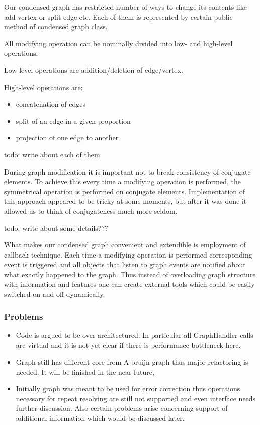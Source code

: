 \documentclass[12pt]{article}
\begin{document}
Our condensed graph has restricted number of ways to change its contents like add vertex or split edge etc. Each of them is represented by certain public method of condensed graph class.

All modifying operation can be nominally divided into low- and high-level operations.

Low-level operations are addition/deletion of edge/vertex.

High-level operations are:
\begin{itemize}
\item concatenation of edges
\item split of an edge in a given proportion
\item projection of one edge to another
\end{itemize}

todo: write about each of them

During graph modification it is important not to break consistency of conjugate elements. To achieve this every time a modifying operation is performed, the symmetrical operation is performed on conjugate elements. Implementation of this approach appeared to be tricky at some moments, but after it was done it allowed us to think of conjugateness much more seldom. 

todo: write about some details???

What makes our condensed graph convenient and extendible is employment of callback technique. Each time a modifying operation is performed corresponding event is triggered and all objects that listen to graph events are notified about what exactly happened to the graph.%
 Thus instead of overloading graph structure with information and features one can create external tools which could be easily switched on and off dynamically.

\subsubsection{Problems}
\begin{itemize}
\item Code is argued to be over-architectured. In particular all GraphHandler calls are virtual and it is not yet clear if there is performance bottleneck here.
\item Graph still has different core from A-bruijn graph thus major refactoring is needed. It will be finished in the near future,
\item Initially graph was meant to be used for error correction thus operations necessary for repeat resolving are still not supported and even interface needs further discussion. Also certain problems arise concerning support of additional information which would be discussed later.
\end{itemize}
\end{document}
